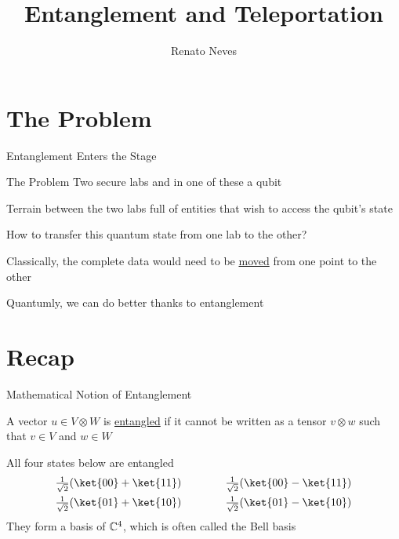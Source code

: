 \documentclass{beamer}
\author[Renato Neves]{Renato Neves}
\date{}
\begin{document}
\title{Entanglement and Teleportation}

\frame[plain]{\titlepage}

\section{The Problem}

\begin{frame}{Entanglement Enters the Stage}

        \begin{block}{The Problem}
                Two secure labs and in one of these a qubit 

                Terrain between the two labs full of entities
                that wish to access the qubit's state

                How to transfer this quantum state from one lab to the other?
        \end{block}

        \pause
        Classically, the complete data would need to be \alert{\underline{moved}}
        from one point to the other 

        \pause
        Quantumly, we can do better thanks to entanglement
\end{frame}

\section{Recap}

\begin{frame}{Mathematical Notion of Entanglement}

        \begin{definition}
                A vector $u \in V \otimes W$ is \alert{\underline{entangled}}
                if it cannot be written as a tensor $v \otimes w$ such that $v \in
                V$ and $w \in W$
        \end{definition}

        \pause
        \begin{example}
                All four states below are entangled
                \begin{align*}
                        \textstyle{\frac{1}{\sqrt{2}}}(\ket{00} + \ket{11})
                        \qquad \qquad &
                        \textstyle{\frac{1}{\sqrt{2}}}(\ket{00} - \ket{11})
                        \\
                        \textstyle{\frac{1}{\sqrt{2}}}(\ket{01} + \ket{10})
                        \qquad \qquad &
                        \textstyle{\frac{1}{\sqrt{2}}}(\ket{01} - \ket{10})
                \end{align*}
                They form a basis of $\mathbb{C}^4$,
                which is often called the \alert{Bell basis}
        \end{example}
\end{frame}
\end{document}
